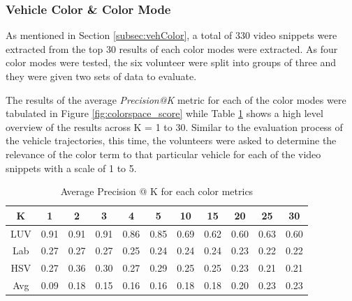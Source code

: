 \subsubsection{Vehicle Color \& Color Mode}

As mentioned in Section \ref{subsec:vehColor}, a total of 330 video snippets were extracted from the top 30 results of each color modes were extracted. As four color modes were tested, the six volunteer were split into groups of three and they were given two sets of data to evaluate. 

The results of the average \textit{Precision@K} metric for each of the color modes were tabulated in Figure \ref{fig:colorspace_score} while Table \ref{tab:avg@k} shows a high level overview of the results across K = 1 to 30. Similar to the evaluation process of the vehicle trajectories, this time, the volunteers were asked to determine the relevance of the color term to that particular vehicle for each of the video snippets with a scale of 1 to 5. 

\begin{table}[!t]
	\centering
	\caption{Average Precision @ K for each color metrics}
	\label{tab:avg@k}
\begin{tabular}{c||c|c|c|c|c|c|c|c|c|c}
K & 1 & 2 & 3 & 4 & 5 & 10 & 15 & 20 & 25 & 30  \\ \hline \hline 
\rowcolor{yellow} LUV  & 0.91 & 0.91 & 0.91 & 0.86 & 0.85 & 0.69 & 0.62 & 0.60 & 0.63 & 0.60 \\ 
Lab  & 0.27 & 0.27 & 0.27 & 0.25 & 0.24 & 0.24 & 0.24 & 0.23 & 0.22 & 0.22 \\ 
HSV & 0.27 & 0.36 & 0.30 & 0.27 & 0.29 & 0.25 & 0.25 & 0.23 & 0.21 & 0.21 \\  
Avg & 0.09 & 0.18 & 0.15 & 0.16 & 0.16 & 0.18 & 0.18 & 0.20 & 0.23 & 0.23 \\ 
\end{tabular} 
\end{table}


